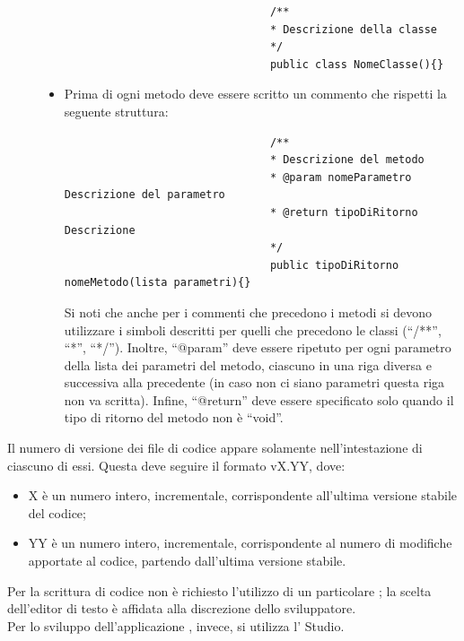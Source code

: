 \begin{description}
\begin{itemize}
							\begin{lstlisting}
								/**
								* Descrizione della classe
								*/
								public class NomeClasse(){}
							\end{lstlisting}
							\item Prima di ogni metodo deve essere scritto un commento che rispetti la seguente struttura:
							\begin{lstlisting}
								/**
								* Descrizione del metodo
								* @param nomeParametro Descrizione del parametro 
								* @return tipoDiRitorno Descrizione 
								*/
								public tipoDiRitorno nomeMetodo(lista parametri){}
							\end{lstlisting}
							Si noti che anche per i commenti che precedono i metodi si devono utilizzare i simboli descritti per quelli che precedono le classi (“/**”, “*”, “*/”). Inoltre, “@param” deve essere ripetuto per ogni parametro della lista dei parametri del metodo, ciascuno in una riga diversa e successiva alla precedente (in caso non ci siano parametri questa riga non va scritta). Infine, “@return” deve essere specificato solo quando il tipo di ritorno del metodo non è “void”.
						\end{itemize}
			\end{description}
			 \label{sec:versionecodice}
			Il numero di versione dei file di codice appare solamente nell'intestazione di ciascuno di essi. Questa deve seguire il formato vX.YY, dove:
			\begin{itemize}
				\item X è un numero intero, incrementale, corrispondente all'ultima versione stabile del codice;
				\item YY è un numero intero, incrementale, corrispondente al numero di modifiche apportate al codice, partendo dall'ultima versione stabile.
			\end{itemize}
			Per la scrittura di codice  non è richiesto l'utilizzo di un particolare ; la scelta dell'editor di testo è affidata alla discrezione dello sviluppatore.\\
			Per lo sviluppo dell'applicazione , invece, si utilizza l'  Studio.